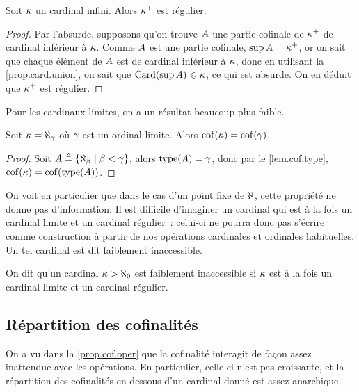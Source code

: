 \begin{theorem}
  Soit $\kappa$ un cardinal infini. Alors $\kappa^{+}$ est régulier.
\end{theorem}

\begin{proof}
  Par l'absurde, supposons qu'on trouve $A$ une partie cofinale de
  $\kappa^{+}$ de cardinal inférieur à $\kappa$. Comme $A$ est une partie
  cofinale, $\sup A = \kappa^{+}$, or on sait que chaque élément de
  $A$ est de cardinal inférieur à $\kappa$, donc en utilisant la
  \cref{prop.card.union}, on sait que $\operatorname{Card}(\sup A) \leqslant \kappa$, ce qui
  est absurde. On en déduit que $\kappa^{+}$ est régulier.
\end{proof}

\noindent
Pour les cardinaux limites, on a un résultat beaucoup plus faible.

\begin{proposition}
  Soit $\kappa = \aleph_\gamma$ où $\gamma$ est un ordinal limite. Alors
  $\operatorname{cof}(\kappa) = \operatorname{cof}(\gamma)$.
\end{proposition}

\begin{proof}
  Soit $A\triangleq \left\{ \aleph_\beta \;\middle\vert\; \beta < \gamma \right\}$, alors
  $\operatorname{type}(A) = \gamma$, donc par le \cref{lem.cof.type},
  $\operatorname{cof}(\kappa) = \operatorname{cof}(\operatorname{type}(A))$.
\end{proof}

On voit en particulier que dans le cas d'un point fixe de $\aleph$, cette
propriété ne donne pas d'information. Il est difficile d'imaginer
un cardinal qui est à la fois un cardinal limite et un cardinal régulier~:
celui-ci ne pourra donc pas s'écrire comme construction à partir de nos
opérations cardinales et ordinales habituelles. Un tel cardinal est dit
faiblement inaccessible.

\begin{definition}
  On dit qu'un cardinal $\kappa > \aleph_0$ est faiblement inaccessible si
  $\kappa$ est à la fois un cardinal limite et un cardinal régulier.
\end{definition}

\subsection{Répartition des cofinalités}

On a vu dans la \cref{prop.cof.oper} que la cofinalité interagit de façon assez
inattendue avec les opérations. En particulier, celle-ci n'est pas croissante,
et la répartition des cofinalités en-dessous d'un cardinal donné est assez
anarchique.


